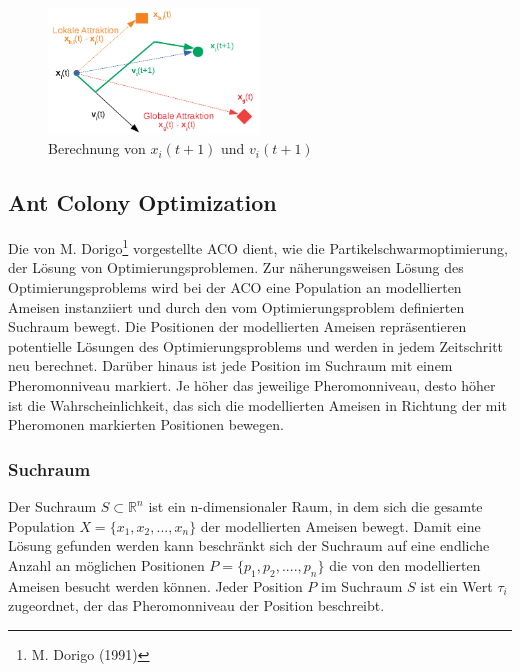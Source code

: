 \documentclass[a4paper, 11pt]{article}
\begin{document}
\begin{figure}[h]
	\begin{center}
		\includegraphics[width=0.50\textwidth]{pso}
	\end{center}
	\hspace{1in}\parbox{4in}{\caption[\acs{PSO}, Berechnung von $x_{i}(t+1)$ und $v_{i}(t+1)$]{Berechnung von $x_{i}(t+1)$ und $v_{i}(t+1)$}}
	\label{psoabb}
\end{figure}
\newpage
\subsection{Ant Colony Optimization}
Die von M. Dorigo\footnote{M. Dorigo (1991)} vorgestellte \ac{ACO} dient, wie die Partikelschwarmoptimierung, der Lösung von Optimierungsproblemen. Zur näherungsweisen Lösung des Optimierungsproblems wird bei der \acs{ACO} eine Population an modellierten Ameisen instanziiert und durch den vom Optimierungsproblem definierten Suchraum bewegt. Die Positionen der modellierten Ameisen repräsentieren potentielle Lösungen des Optimierungsproblems und werden in jedem Zeitschritt neu berechnet. Darüber hinaus ist jede Position im Suchraum mit einem Pheromonniveau markiert. Je höher das jeweilige Pheromonniveau, desto höher ist die Wahrscheinlichkeit, das sich die modellierten Ameisen in Richtung der mit Pheromonen markierten Positionen bewegen.
\subsubsection{Suchraum}
Der Suchraum $S \subset \mathbb{R}^n$ ist ein n-dimensionaler Raum, in dem sich die gesamte Population $X=\{x_{1},x_{2},...,x_{n}\}$ der modellierten Ameisen bewegt. Damit eine Lösung gefunden werden kann beschränkt sich der Suchraum auf eine endliche Anzahl an möglichen Positionen $P=\{p_{1},p_{2},....,p_{n}\}$ die von den modellierten Ameisen besucht werden können. Jeder Position $P$ im Suchraum $S$ ist ein Wert $\tau_{i}$ zugeordnet, der das Pheromonniveau der Position beschreibt.
\end{document}
